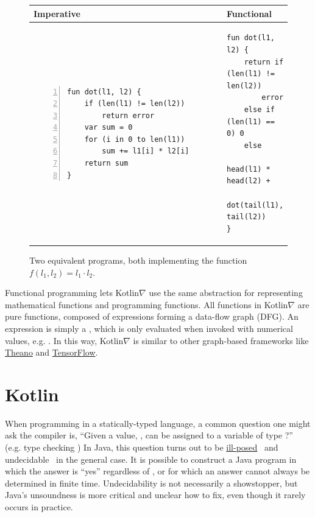\begin{figure}[t]
    \centering
    \begin{tabular}{|l|l|}
        \hline
        Imperative & Functional \\
        \hline
{\begin{lstlisting}[style=barelisting, linewidth=5.7cm, numbers=left]
fun dot(l1, l2) {
    if (len(l1) != len(l2))
        return error
    var sum = 0
    for (i in 0 to len(l1))
        sum += l1[i] * l2[i]
    return sum
}
\end{lstlisting}}
        &
{\begin{lstlisting}[style=barelisting, linewidth=6.5cm, numbers=none]
fun dot(l1, l2) {
    return if (len(l1) != len(l2))
        error
    else if (len(l1) == 0) 0
    else
        head(l1) * head(l2) +
        dot(tail(l1), tail(l2))
}
\end{lstlisting}}
        \\
        \hline
    \end{tabular}
    \caption{Two equivalent programs, both implementing the function $f(l_1, l_2) = l_1 \cdot l_2$.}
    \label{fig:fp_vs_ip}
\end{figure}

Functional programming lets Kotlin$\nabla$ use the same abstraction for representing mathematical functions and programming functions. All functions in Kotlin$\nabla$ are pure functions, composed of expressions forming a data-flow graph (DFG). An expression is simply a , which is only evaluated when invoked with numerical values, e.g. . In this way, Kotlin$\nabla$ is similar to other graph-based frameworks like \href{http://deeplearning.net/software/theano/extending/graphstructures.html}{Theano} and \href{https://www.tensorflow.org/guide/graphs}{TensorFlow}.

\section{Kotlin}\label{sec:kotlin}

When programming in a statically-typed language, a common question one might ask the compiler is, ``Given a value, , can  be assigned to a variable of type ?'' (e.g. type checking ) In Java, this question turns out to be \href{http://io.livecode.ch/learn/namin/unsound}{ill-posed}~\citep{amin2016java} and undecidable~\citep{grigore2017java} in the general case. It is possible to construct a Java program in which the answer is ``yes'' regardless of , or for which an answer cannot always be determined in finite time. Undecidability is not necessarily a showstopper, but Java's unsoundness is more critical and unclear how to fix, even though it rarely occurs in practice.

